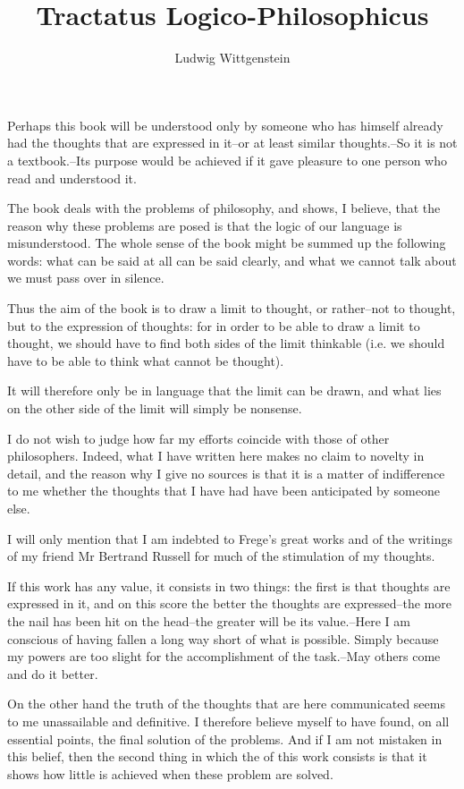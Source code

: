 \documentclass[11pt]{article}
\author{Ludwig Wittgenstein}
\date{}
\title{Tractatus Logico-Philosophicus}
\begin{document}
\maketitle
\tableofcontents

Perhaps this book will be understood only by someone who has himself
already had the thoughts that are expressed in it--or at least similar
thoughts.--So it is not a textbook.--Its purpose would be achieved if it
gave pleasure to one person who read and understood it.

The book deals with the problems of philosophy, and shows, I believe, that
the reason why these problems are posed is that the logic of our language
is misunderstood. The whole sense of the book might be summed up the
following words: what can be said at all can be said clearly, and what we
cannot talk about we must pass over in silence.

Thus the aim of the book is to draw a limit to thought, or rather--not to
thought, but to the expression of thoughts: for in order to be able to draw
a limit to thought, we should have to find both sides of the limit
thinkable (i.e. we should have to be able to think what cannot be thought).

It will therefore only be in language that the limit can be drawn, and what
lies on the other side of the limit will simply be nonsense.

I do not wish to judge how far my efforts coincide with those of other
philosophers. Indeed, what I have written here makes no claim to novelty in
detail, and the reason why I give no sources is that it is a matter of
indifference to me whether the thoughts that I have had have been
anticipated by someone else.

I will only mention that I am indebted to Frege's great works and of the
writings of my friend Mr Bertrand Russell for much of the stimulation of my
thoughts.

If this work has any value, it consists in two things: the first is that
thoughts are expressed in it, and on this score the better the thoughts are
expressed--the more the nail has been hit on the head--the greater will be
its value.--Here I am conscious of having fallen a long way short of what
is possible. Simply because my powers are too slight for the accomplishment
of the task.--May others come and do it better.

On the other hand the truth of the thoughts that are here communicated
seems to me unassailable and definitive. I therefore believe myself to have
found, on all essential points, the final solution of the problems. And if
I am not mistaken in this belief, then the second thing in which the of
this work consists is that it shows how little is achieved when these
problem are solved.
\end{document}
